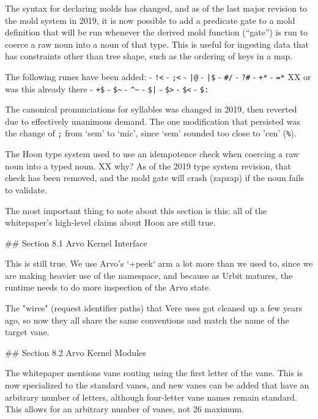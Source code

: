 \documentclass[twoside]{article}
\begin{document}
The syntax for declaring molds has changed, and as of the last major revision to the mold system in 2019, it is now possible to add a predicate gate to a mold definition that will be run whenever the derived mold function (``gate'') is run to coerce a raw noun into a noun of that type.  This is useful for ingesting data that has constraints other than tree shape, such as the ordering of keys in a map.

The following runes have been added:
- \lstinline[style=inlinecode]{!<}
- \lstinline[style=inlinecode]{;<}
- \lstinline[style=inlinecode]{|@}
- \lstinline[style=inlinecode]{|$}
- \lstinline[style=inlinecode]{#/}
- \lstinline[style=inlinecode]{?#}
- \lstinline[style=inlinecode]{+*}
- \lstinline[style=inlinecode]{=*}  XX or was this already there
- \lstinline[style=inlinecode]{+$}
- \lstinline[style=inlinecode]{$~}
- \lstinline[style=inlinecode]{^~}
- \lstinline[style=inlinecode]{$|}
- \lstinline[style=inlinecode]{$>}
- \lstinline[style=inlinecode]{$<}
- \lstinline[style=inlinecode]{$:}

The canonical pronunciations for syllables was changed in 2019, then reverted due to effectively unanimous demand.  The one modification that persisted was the change of \lstinline[style=inlinecode]{;} from `sem' to `mic', since `sem' sounded too close to 'cen' (\lstinline[style=inlinecode]{%}).

The Hoon type system used to use an idempotence check when coercing a raw noun into a typed noun.  XX why?  As of the 2019 type system revision, that check has been removed, and the mold gate will crash (zapzap) if the noun fails to validate.

The most important thing to note about this section is this: all of the whitepaper's high-level claims about Hoon are still true.

## Section 8.1 Arvo Kernel Interface

This is still true.  We use Arvo's `+peek` arm a lot more than we used to, since we are making heavier use of the namespace, and because as Urbit matures, the runtime needs to do more inspection of the Arvo state.

The "wires" (request identifier paths) that Vere uses got cleaned up a few years ago, so now they all share the same conventions and match the name of the target vane.

## Section 8.2 Arvo Kernel Modules

The whitepaper mentions vane routing using the first letter of the vane.  This is now specialized to the standard vanes, and new vanes can be added that have an arbitrary number of letters, although four-letter vane names remain standard.  This allows for an arbitrary number of vanes, not 26 maximum.
\end{document}
